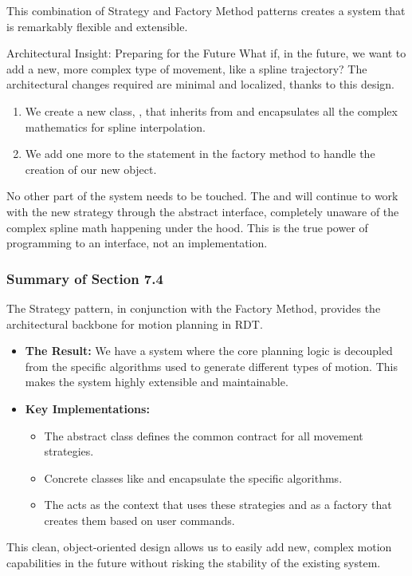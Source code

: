 This combination of Strategy and Factory Method patterns creates a system that is remarkably flexible and extensible.

\begin{tipbox}{Architectural Insight: Preparing for the Future}
What if, in the future, we want to add a new, more complex type of movement, like a spline trajectory? The architectural changes required are minimal and localized, thanks to this design.
\begin{enumerate}
    \item We create a new class, , that inherits from  and encapsulates all the complex mathematics for spline interpolation.
    \item We add one more  to the  statement in the  factory method to handle the creation of our new  object.
\end{enumerate}

 No other part of the system needs to be touched. The  and  will continue to work with the new strategy through the abstract  interface, completely unaware of the complex spline math happening under the hood. This is the true power of programming to an interface, not an implementation.
\end{tipbox}

\subsubsection{Summary of Section 7.4}
\label{subsubsec:section7_4_summary}
The Strategy pattern, in conjunction with the Factory Method, provides the architectural backbone for motion planning in RDT.
\begin{itemize}
    \item \textbf{The Result:} We have a system where the core planning logic is decoupled from the specific algorithms used to generate different types of motion. This makes the system highly extensible and maintainable.
    \item \textbf{Key Implementations:}
    \begin{itemize}
        \item The abstract  class defines the common contract for all movement strategies.
        \item Concrete classes like  and  encapsulate the specific algorithms.
        \item The  acts as the context that uses these strategies and as a factory that creates them based on user commands.
    \end{itemize}
\end{itemize}
This clean, object-oriented design allows us to easily add new, complex motion capabilities in the future without risking the stability of the existing system.










